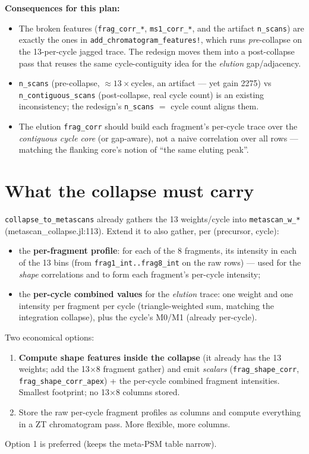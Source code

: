 \documentclass[11pt]{article}
\newcommand{\code}[1]{\texttt{\small #1}}
\begin{document}
\textbf{Consequences for this plan:}
\begin{itemize}
\item The broken features (\code{frag\_corr\_*}, \code{ms1\_corr\_*}, and the artifact
\code{n\_scans}) are exactly the ones in \code{add\_chromatogram\_features!}, which
runs \emph{pre}-collapse on the 13-per-cycle jagged trace. The redesign moves them
into a post-collapse pass that reuses the same cycle-contiguity idea for the
\emph{elution} gap/adjacency.
\item \code{n\_scans} (pre-collapse, $\approx 13\times$cycles, an artifact --- yet gain
2275) vs \code{n\_contiguous\_scans} (post-collapse, real cycle count) is an existing
inconsistency; the redesign's \code{n\_scans} $=$ cycle count aligns them.
\item The elution \code{frag\_corr} should build each fragment's per-cycle trace over
the \emph{contiguous cycle core} (or gap-aware), not a naive correlation over all
rows --- matching the flanking core's notion of ``the same eluting peak''.
\end{itemize}

\section{What the collapse must carry}

\code{collapse\_to\_metascans} already gathers the 13 weights/cycle into
\code{metascan\_w\_*} (metascan\_collapse.jl:113). Extend it to also gather, per
(precursor, cycle):
\begin{itemize}
\item the \textbf{per-fragment profile}: for each of the 8 fragments, its intensity
in each of the 13 bins (from \code{frag1\_int..frag8\_int} on the raw rows) --- used
for the \emph{shape} correlations and to form each fragment's per-cycle intensity;
\item the \textbf{per-cycle combined values} for the \emph{elution} trace: one weight
and one intensity per fragment per cycle (triangle-weighted sum, matching the
integration collapse), plus the cycle's M0/M1 (already per-cycle).
\end{itemize}
Two economical options:
\begin{enumerate}
\item \textbf{Compute shape features inside the collapse} (it already has the 13
weights; add the 13$\times$8 fragment gather) and emit \emph{scalars}
(\code{frag\_shape\_corr}, \code{frag\_shape\_corr\_apex}) + the per-cycle combined
fragment intensities. Smallest footprint; no 13$\times$8 columns stored.
\item Store the raw per-cycle fragment profiles as columns and compute everything in
a ZT chromatogram pass. More flexible, more columns.
\end{enumerate}
Option 1 is preferred (keeps the meta-PSM table narrow).
\end{document}
